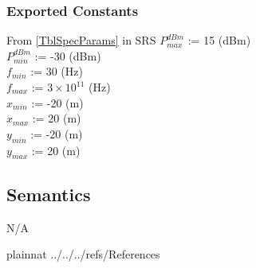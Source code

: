 \documentclass[12pt, titlepage]{article}
\begin{document}
\subsubsection{Exported Constants}

From \autoref{TblSpecParams} in SRS
  $P_{max}^{dBm}$ := 15 (\si{dBm})\\
  $P_{min}^{dBm}$ := -30 (\si{dBm})\\
  $f_{min}$ := 30 (\si{\hertz})\\
  $f_{max}$ := $3\times 10^{11}$  (\si{\hertz})\\
  $x_{min}$ := -20 (\si{\meter})\\
  $x_{max}$ := 20 (\si{\meter})\\
  $y_{min}$ := -20 (\si{\meter})\\
  $y_{max}$ := 20 (\si{\meter})\\

\subsection{Semantics}
N/A



\newpage

 {plainnat}
 {../../../refs/References}
\end{document}
